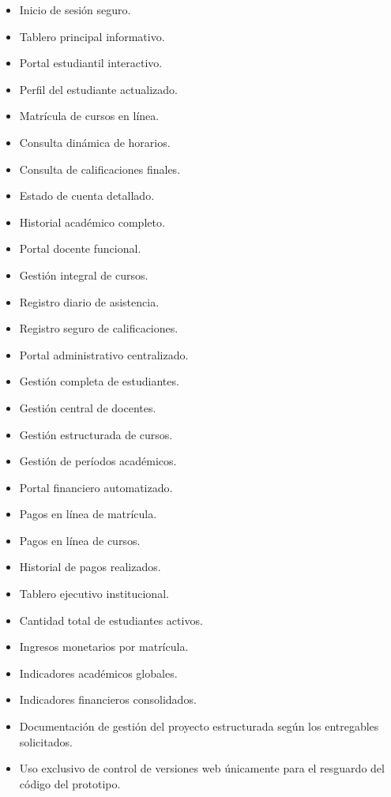 \documentclass[11pt,spanish]{article}
\begin{document}
\begin{itemize}
    \item Inicio de sesión seguro.
    \item Tablero principal informativo.
    \item Portal estudiantil interactivo.
    \item Perfil del estudiante actualizado.
    \item Matrícula de cursos en línea.
    \item Consulta dinámica de horarios.
    \item Consulta de calificaciones finales.
    \item Estado de cuenta detallado.
    \item Historial académico completo.
    \item Portal docente funcional.
    \item Gestión integral de cursos.
    \item Registro diario de asistencia.
    \item Registro seguro de calificaciones.
    \item Portal administrativo centralizado.
    \item Gestión completa de estudiantes.
    \item Gestión central de docentes.
    \item Gestión estructurada de cursos.
    \item Gestión de períodos académicos.
    \item Portal financiero automatizado.
    \item Pagos en línea de matrícula.
    \item Pagos en línea de cursos.
    \item Historial de pagos realizados.
    \item Tablero ejecutivo institucional.
    \item Cantidad total de estudiantes activos.
    \item Ingresos monetarios por matrícula.
    \item Indicadores académicos globales.
    \item Indicadores financieros consolidados.
    \item Documentación de gestión del proyecto estructurada según los entregables solicitados.
    \item Uso exclusivo de control de versiones web únicamente para el resguardo del código del prototipo.
\end{itemize}
\end{document}
